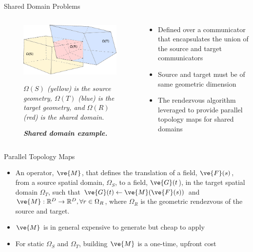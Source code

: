 \documentclass{beamer}
\begin{document}
\begin{frame}{Shared Domain Problems}

  \begin{columns}
    
    \begin{column}{0.5\textwidth}
      \begin{figure}[htpb!]
        \centering \includegraphics[width=2.5in]{overlapping_domain.pdf}
        \caption{\bf \sl Shared domain example.} {\sl $\Omega(S)$ (yellow)
          is the source geometry, $\Omega(T)$ (blue) is the target geometry,
          and $\Omega(R)$ (red) is the shared domain.}
        \label{fig:shared_domain}
      \end{figure}
    \end{column}

    \begin{column}{0.5\textwidth}
      \begin{itemize}
      \item Defined over a communicator that encapsulates the union of
        the source and target communicators
        \medskip
      \item Source and target must be of same geometric dimension
        \medskip
      \item The rendezvous algorithm leveraged to provide parallel
        topology maps for shared domains
      \end{itemize}
    \end{column}

  \end{columns}

\end{frame}

\begin{frame}{Parallel Topology Maps}

  \begin{itemize}
  \item An operator, $\ve{M}$, that defines the translation of a
    field, $\ve{F}(s)$, from a source spatial domain, $\Omega_S$, to a
    field, $\ve{G}(t$), in the target spatial domain $\Omega_T$, such
    that $\ve{G}(t)\leftarrow \ve{M}(\ve{F}(s))$ and $\ve{M}:
    \mathbb{R}^D \rightarrow \mathbb{R}^D, \forall r \in \Omega_R$,
    where $\Omega_R$ is the geometric rendezvous of the source and
    target.
    \medskip
  \item $\ve{M}$ is in general expensive to generate but cheap to
    apply
    \medskip
  \item For static $\Omega_S$ and $\Omega_T$, building $\ve{M}$ is a
    one-time, upfront cost
  \end{itemize}

\end{frame}
\end{document}
